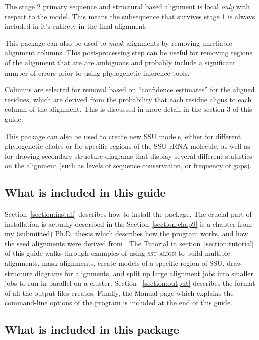 The stage 2 primary sequence and structural based alignment is local
\emph{only} with respect to the model.  This means the subsequence
that survives stage 1 is always included in it's entirety in the final
alignment.

This package can also be used to \emph{mask} alignments by removing
unreliable alignment columns.  This post-processing step can be useful
for removing regions of the alignment that are are ambiguous and
probably include a significant number of errors prior to using
phylogenetic inference tools.

Columns are selected for removal based on ``confidence estimates'' 
for the aligned residues, which are derived from the probability that
each residue aligns to each column of the alignment. This is discussed
in more detail in the section 3 of this guide.

This package can also be used to create new SSU models, either for
different phylogenetic clades or for specific regions of the SSU rRNA
molecule, as well as for drawing secondary structure diagrams that
display several different statistics on the alignment (such as levels
of sequence conservation, or frequency of gaps). 

\subsection{What is included in this guide}

Section~\ref{section:install} describes how to install the
package. The crucial part of installation is actually described in the 
Section~\ref{section:chap9} is a chapter from my (submitted)
Ph.D. thesis which describes how the program works, and how the seed
alignments were derived from  \cite{CannoneGutell02}.
The Tutorial in section~\ref{section:tutorial} of this guide walks
through examples of using \textsc{ssu-align} to build multiple
alignments, mask alignments, create models of a specific region of
SSU, draw structure diagrams for alignments, and split up large
alignment jobs into smaller jobs to run in parallel on a cluster.
Section ~\ref{section:output} describes the format of all the output
files  creates. Finally, the  Manual
page which explains the command-line options of the program is
included at the end of this guide.

\subsection{What is included in this package}

